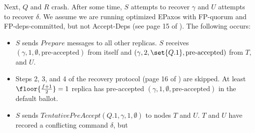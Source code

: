 \documentclass{mwhittaker}
\begin{document}
Next, $Q$ and $R$ crash. After some time, $S$ attempts to recover $\gamma$ and
$U$ attempts to recover $\delta$. We assume we are running optimized EPaxos
with FP-quorum and FP-deps-committed, but not Accept-Deps (see page 15 of
\cite{moraru2013proof}). The following occurs:
\begin{itemize}
  \item
    $S$ sends $Prepare$ messages to all other replicas. $S$ receives $(\gamma,
    1, \emptyset, \text{pre-accepted})$ from itself and $(\gamma, 2, \set{Q.1},
    \text{pre-accepted})$ from $T$, and $U$.
  \item
    Steps 2, 3, and 4 of the recovery protocol (page 16 of
    \cite{moraru2013proof}) are skipped. At least $\floor{\frac{f+1}{2}} = 1$
    replica has pre-accepted $(\gamma, 1, \emptyset, \text{pre-accepted})$ in
    the default ballot.
  \item
    $S$ sends $TentativePreAccept(Q.1, \gamma, 1, \emptyset)$ to nodes $T$ and
    $U$. $T$ and $U$ have recored a conflicting command $\delta$, but
\end{itemize}



\end{document}
